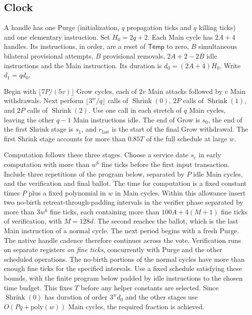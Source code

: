 \subsection{Clock}\label{sec:clock}

A handle has one Purge (initialization, \(q\) propagation ticks and \(q\) killing ticks) and one elementary instruction. Set \(H_0=2q+2\). Each Main cycle has \(2A+4\) handles. Its instructions, in order, are a reset of \(\mathsf{Temp}\) to zero, \(B\) simultaneous bilateral provisional attempts, \(B\) provisional removals, \(2A+2-2B\) idle instructions and the Main instruction. Its duration is \(d_0=(2A+4)H_0\). Write \(d_1=qd_0\).

Begin with \(\lfloor 7P/(5v)\rfloor\) Grow cycles, each of \(2v\) Main attacks followed by \(v\) Main withdrawals. Next perform \(\lfloor 3^w/q\rfloor\) calls of \(\operatorname{Shrink}(0)\), \(2P\) calls of \(\operatorname{Shrink}(1)\), and \(2P\) calls of \(\operatorname{Shrink}(2)\). Use one call in each stretch of \(q\) Main cycles, leaving the other \(q-1\) Main instructions idle. The end of Grow is \(s_0\), the end of the first Shrink stage is \(s_1\), and \(r_{\mathrm{last}}\) is the start of the final Grow withdrawal. The first Shrink stage accounts for more than \(0.85T\) of the full schedule at large \(w\).

Computation follows these three stages. Choose a service date \(s_c\) in early computation with more than \(w^6\) fine ticks before the first input transaction. Include three repetitions of the program below, separated by \(P\) idle Main cycles, and the verification and final ballot. The time for computation is a fixed constant times \(P\) plus a fixed polynomial in \(w\) in Main cycles. Within this allowance insert two no-birth retreat-through-padding intervals in the verifier phase separated by more than \(3w^6\) fine ticks, each containing more than \(100A+4(M+1)\) fine ticks of verification, with \(M=128d\). The second reaches the ballot, which is the last Main instruction of a normal cycle. The next period begins with a fresh Purge. The native handle cadence therefore continues across the vote. Verification runs on separate registers \emph{on fine ticks}, concurrently with Purge and the other scheduled operations. The no-birth portions of the normal cycles have more than enough fine ticks for the specified intervals. Use a fixed schedule satisfying these bounds, with the finite program below padded by idle instructions to the chosen time budget. This fixes \(T\) before any helper constants are selected. Since \(\operatorname{Shrink}(0)\) has duration of order \(3^w d_0\) and the other stages use \(O(Pq+\mathrm{poly}(w))\) Main cycles, the required fraction is achieved.

